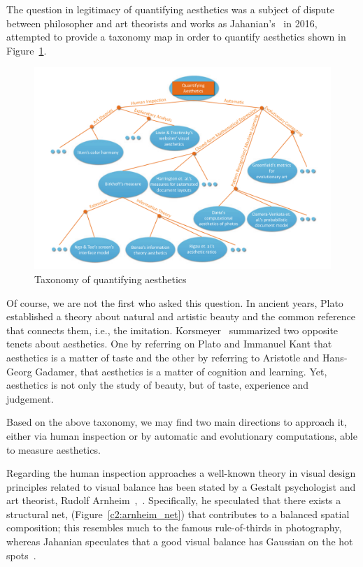 The question in legitimacy of quantifying aesthetics was a subject of dispute between philosopher and art theorists and works as Jahanian's~\cite{jahanian2016quantifying} in 2016, attempted to provide a taxonomy map in order to quantify aesthetics shown in Figure~\ref{c2:aesthetics_taxonomy}.

\begin{figure}[ht!]
    \centering  
    \includegraphics[width=.75\textwidth]{figures/chap2/aesthetics/taxonomy}
    \caption{Taxonomy of quantifying aesthetics}
    \label{c2:aesthetics_taxonomy}
\end{figure}

Of course, we are not the first who asked this question. In ancient years, Plato established a theory about natural and artistic beauty and the common reference that connects them, i.e., the imitation. Korsmeyer~\cite{korsmeyer1998aesthetics} summarized two opposite tenets about aesthetics. One by referring on Plato and Immanuel Kant that aesthetics is a matter of taste and the other by referring to Aristotle and Hans-Georg Gadamer, that aesthetics is a matter of cognition and learning. Yet, aesthetics is not only the study of beauty, but of taste, experience and judgement.

Based on the above taxonomy, we may find two main directions to approach it, either via human inspection or by automatic and evolutionary computations, able to measure aesthetics.


Regarding the human inspection approaches a well-known theory in visual design principles related to visual balance has been stated by a Gestalt psychologist and art theorist, Rudolf Arnheim~\cite{arnheim1960art},~\cite{marr1982vision}.
Specifically, he speculated that there exists a structural net, (Figure~\ref{c2:arnheim_net}) that contributes to a balanced spatial composition; this resembles much to the famous rule-of-thirds in photography, whereas Jahanian speculates that a good visual balance has Gaussian on the hot spots~\cite{jahanian2016deepcreativity}.

